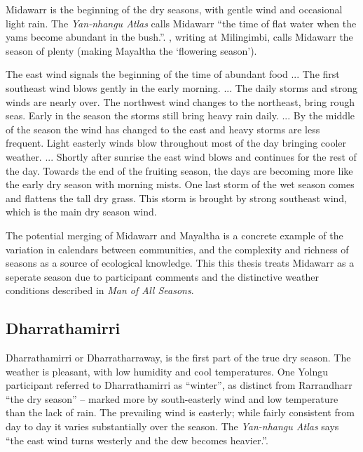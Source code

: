 Midawarr is the beginning of the dry seasons, with gentle wind and occasional
light rain.  The \textit{Yan-nhangu Atlas} calls Midawarr ``the time of flat
water when the yams become abundant in the bush.''.  \citet{davis1989}, writing
at Milingimbi, calls Midawarr the season of plenty (making Mayaltha the `flowering season').
\begin{bquote}{\citet{davis1989}}
    The east wind signals the beginning of the time of abundant food ...
    The first southeast wind blows gently in the early morning. ...
    The daily storms and strong winds are nearly over.
    The northwest wind changes to the northeast, bring rough seas.
    Early in the season the storms still bring heavy rain daily.
    ...
    By the middle of the season the wind has changed to the east and
    heavy storms are less frequent.  Light easterly winds blow
    throughout most of the day bringing cooler weather.
    ...
    Shortly after sunrise the east wind blows and continues for the
    rest of the day.  Towards the end of the fruiting season, the days
    are becoming  more like the early dry season with morning mists.
    One last storm of the wet season comes and flattens the tall dry grass.
    This storm is brought by strong southeast wind, which is the main dry season wind.
\end{bquote}

The potential merging of Midawarr and Mayaltha is a concrete example of the
variation in calendars between communities, and the complexity and richness
of seasons as a source of ecological knowledge.  This this thesis treats
Midawarr as a seperate season due to participant comments and the distinctive
weather conditions described in \textit{Man of All Seasons}.


\subsection{Dharrathamirri}
Dharrathamirri or Dharratharraway, is the first part of the
true dry season.  The weather is pleasant, with low humidity and cool
temperatures.  One Yolngu participant referred to Dharrathamirri as ``winter'',
as distinct from Rarrandharr ``the dry season'' -- marked more by south-easterly wind
and low temperature than the lack of rain.
%
The prevailing wind is easterly; while fairly consistent from day to day
it varies substantially over the season.  The \textit{Yan-nhangu Atlas}
says ``the east wind turns westerly and the dew becomes heavier.''.

